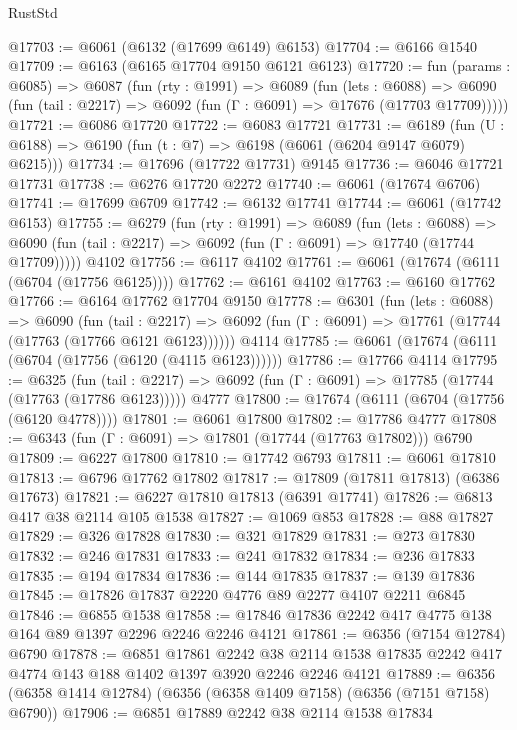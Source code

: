 \begin{lexlean}{RustStd}
\begin{coremodule}
{\begin{coremodule}
{{{{{{{{{{{{{{{{{{{{{{{{{{@17703 := @6061 (@6132 (@17699 @6149) @6153)
@17704 := @6166 @1540
@17709 := @6163 (@6165 @17704 @9150 @6121 @6123)
@17720 := fun (params : @6085) =>
  @6087
    (fun (rty : @1991) =>
    @6089
      (fun (lets : @6088) =>
      @6090 (fun (tail : @2217) => @6092 (fun (Γ : @6091) => @17676 (@17703 @17709)))))
@17721 := @6086 @17720
@17722 := @6083 @17721
@17731 := @6189 (fun (U : @6188) => @6190 (fun (t : @7) => @6198 (@6061 (@6204 @9147 @6079) @6215)))
@17734 := @17696 (@17722 @17731) @9145
@17736 := @6046 @17721 @17731
@17738 := @6276 @17720 @2272
@17740 := @6061 (@17674 @6706)
@17741 := @17699 @6709
@17742 := @6132 @17741
@17744 := @6061 (@17742 @6153)
@17755 := @6279
    (fun (rty : @1991) =>
    @6089
      (fun (lets : @6088) =>
      @6090 (fun (tail : @2217) => @6092 (fun (Γ : @6091) => @17740 (@17744 @17709)))))
    @4102
@17756 := @6117 @4102
@17761 := @6061 (@17674 (@6111 (@6704 (@17756 @6125))))
@17762 := @6161 @4102
@17763 := @6160 @17762
@17766 := @6164 @17762 @17704 @9150
@17778 := @6301
    (fun (lets : @6088) =>
    @6090
      (fun (tail : @2217) =>
      @6092 (fun (Γ : @6091) => @17761 (@17744 (@17763 (@17766 @6121 @6123))))))
    @4114
@17785 := @6061 (@17674 (@6111 (@6704 (@17756 (@6120 (@4115 @6123))))))
@17786 := @17766 @4114
@17795 := @6325
    (fun (tail : @2217) => @6092 (fun (Γ : @6091) => @17785 (@17744 (@17763 (@17786 @6123)))))
    @4777
@17800 := @17674 (@6111 (@6704 (@17756 (@6120 @4778))))
@17801 := @6061 @17800
@17802 := @17786 @4777
@17808 := @6343 (fun (Γ : @6091) => @17801 (@17744 (@17763 @17802))) @6790
@17809 := @6227 @17800
@17810 := @17742 @6793
@17811 := @6061 @17810
@17813 := @6796 @17762 @17802
@17817 := @17809 (@17811 @17813) (@6386 @17673)
@17821 := @6227 @17810 @17813 (@6391 @17741)
@17826 := @6813 @417 @38 @2114 @105 @1538
@17827 := @1069 @853
@17828 := @88 @17827
@17829 := @326 @17828
@17830 := @321 @17829
@17831 := @273 @17830
@17832 := @246 @17831
@17833 := @241 @17832
@17834 := @236 @17833
@17835 := @194 @17834
@17836 := @144 @17835
@17837 := @139 @17836
@17845 := @17826 @17837 @2220 @4776 @89 @2277 @4107 @2211 @6845
@17846 := @6855 @1538
@17858 := @17846 @17836 @2242 @417 @4775 @138 @164 @89 @1397 @2296 @2246 @2246 @4121
@17861 := @6356 (@7154 @12784) @6790
@17878 := @6851
    @17861
    @2242
    @38
    @2114
    @1538
    @17835
    @2242
    @417
    @4774
    @143
    @188
    @1402
    @1397
    @3920
    @2246
    @2246
    @4121
@17889 := @6356 (@6358 @1414 @12784) (@6356 (@6358 @1409 @7158) (@6356 (@7151 @7158) @6790))
@17906 := @6851
    @17889
    @2242
    @38
    @2114
    @1538
    @17834
}}}}}}}}}}}}}}}}}}}}}}}}}}
\end{coremodule}}
\end{coremodule}
\end{lexlean}
